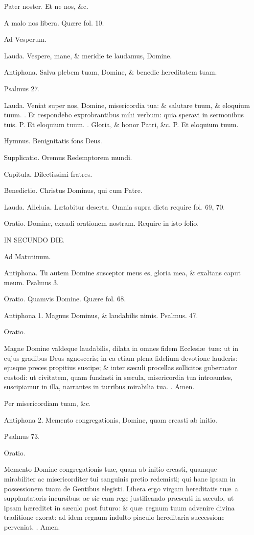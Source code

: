 \documentclass[letter,11pt]{book}
\makeatletter
\DeclareRobustCommand{\Vbar}{\vers@resp{-0.1em}{V}}
\DeclareRobustCommand{\Rbar}{\vers@resp{0pt}{R}}
\newcommand{\vers@resp@sym}{\raisebox{0.2ex}{\rotatebox[origin=c]{-20}{$\m@th\rceil$}}}
\newcommand{\vers@resp}[2]{%
  {\ooalign{\hidewidth\kern#1\vers@resp@sym\hidewidth\cr#2\cr}}%
}%
\def\P{\color{Red} P. \color{black}}
\def\V{\color{Red} \Vbar . \color{black}}
\def\R{\color{Red} \Rbar . \color{black}}
\makeatother
\begin{document}
\begin{multicols*}{2}
Pater noster. Et ne nos, \&c.

A malo nos libera. Qu\ae re fol. 10.

Ad Vesperum.

Lauda. Vespere, mane, \& meridie te laudamus, Domine.

Antiphona. Salva plebem tuam, Domine, \& benedic hereditatem tuam.

Psalmus 27.

Lauda. Veniat super nos, Domine, misericordia tua: \& salutare tuum, \& eloquium tuum. \V Et respondebo exprobrantibus mihi verbum: quia speravi in sermonibus tuis. \P Et eloquium tuum. \V Gloria, \& honor Patri, \&c. \P Et eloquium tuum.

Hymnus. Benignitatis fons Deus.

Supplicatio. Oremus Redemptorem mundi.

Capitula. Dilectissimi fratres.

Benedictio. Christus Dominus, qui cum Patre.

Lauda. Alleluia. L\ae tabitur deserta. Omnia supra dicta require fol. 69, 70.

Oratio. Domine, exaudi orationem nostram. Require in isto folio.

IN SECUNDO DIE.

Ad Matutinum.

Antiphona. Tu autem Domine susceptor meus es, gloria mea, \& exaltans caput meum. Psalmus 3.

Oratio. Quamvis Domine. Qu\ae re fol. 68.

Antiphona 1. Magnus Dominus, \& laudabilis nimis. Psalmus. 47.

Oratio.

Magne Domine valdeque laudabilis, dilata in omnes fidem Ecclesi\ae \ tu\ae : ut in cujus gradibus Deus agnosceris; in ea etiam plena fidelium devotione lauderis: ejusque preces propitius suscipe; \& inter s\ae culi procellas sollicitos gubernator custodi: ut civitatem, quam fundasti in s\ae cula, misericordia tua intr\oe untes, suscipiamur in illa, narrantes in turribus mirabilia tua.
\R Amen.

Per misericordiam tuam, \&c.

Antiphona 2. Memento congregationis, Domine, quam creasti ab initio.

Psalmus 73.

Oratio.

Memento Domine congregationis tu\ae , quam ab initio creasti, quamque mirabiliter ac misericorditer tui sanguinis pretio redemisti; qui hanc ipsam in possessionem tuam de Gentibus elegisti. Libera ergo virgam hereditatis tu\ae \ a supplantatoris incursibus: ac sic eam rege justificando pr\ae senti in s\ae culo, ut ipsam h\ae reditet in s\ae culo post futuro: \& qu\ae \ regnum tuum advenire divina traditione exorat: ad idem regnum indulto piaculo hereditaria successione perveniat.
\R Amen.


\end{multicols*}
\end{document}
